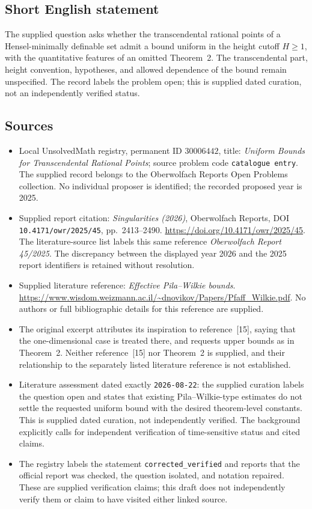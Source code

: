 \documentclass[11pt]{article}
\begin{document}
\subsection{Short English statement}
The supplied question asks whether the transcendental rational points of a Hensel-minimally definable set admit a bound uniform in the height cutoff \(H\geq1\), with the quantitative features of an omitted Theorem~2. The transcendental part, height convention, hypotheses, and allowed dependence of the bound remain unspecified. The record labels the problem open; this is supplied dated curation, not an independently verified status.
\subsection{Sources}
\begin{itemize}
\item Local UnsolvedMath registry, permanent ID \(30006442\), title: \emph{Uniform Bounds for Transcendental Rational Points}; source problem code \texttt{catalogue entry}. The supplied record belongs to the Oberwolfach Reports Open Problems collection. No individual proposer is identified; the recorded proposed year is 2025.
\item Supplied report citation: \emph{Singularities (2026)}, Oberwolfach Reports, DOI \texttt{10.4171/owr/2025/45}, pp.~2413--2490. \url{https://doi.org/10.4171/owr/2025/45}. The literature-source list labels this same reference \emph{Oberwolfach Report 45/2025}. The discrepancy between the displayed year 2026 and the 2025 report identifiers is retained without resolution.
\item Supplied literature reference: \emph{Effective Pila--Wilkie bounds}. \url{https://www.wisdom.weizmann.ac.il/~dnovikov/Papers/Pfaff_Wilkie.pdf}. No authors or full bibliographic details for this reference are supplied.
\item The original excerpt attributes its inspiration to reference~[15], saying that the one-dimensional case is treated there, and requests upper bounds as in Theorem~2. Neither reference~[15] nor Theorem~2 is supplied, and their relationship to the separately listed literature reference is not established.
\item Literature assessment dated exactly \texttt{2026-08-22}: the supplied curation labels the question open and states that existing Pila--Wilkie-type estimates do not settle the requested uniform bound with the desired theorem-level constants. This is supplied dated curation, not independently verified. The background explicitly calls for independent verification of time-sensitive status and cited claims.
\item The registry labels the statement \texttt{corrected\_verified} and reports that the official report was checked, the question isolated, and notation repaired. These are supplied verification claims; this draft does not independently verify them or claim to have visited either linked source.
\end{itemize}
\end{document}
